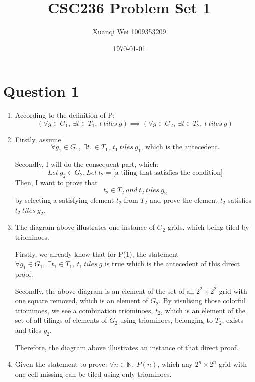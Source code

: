 \documentclass[12pt]{article}
\title{CSC236 Problem Set 1}
\author{Xuanqi Wei 1009353209}
\date{\today}
\begin{document}




\setcounter{page}{1}

\section{Question 1}
\begin{enumerate}[label=(\alph*)]
    \item According to the definition of P:
    $$(\forall g \in G_1,\ \exists t \in T_1,\ t\ tiles\ g) \implies (\forall g \in G_2,\ \exists t \in T_2,\ t\ tiles\ g) $$

    \item 
    Firstly, assume $$\forall g_1 \in G_1,\ \exists t_1 \in T_1,\ t_1\ tiles\ g_1\text{, which is the antecedent.}$$
    
    Secondly, I will do the consequent part, which: $$Let\ g_2 \in G_2.\ Let\ t_2 = \text{[a tiling that satisfies the condition]}$$ 
    Then, I want to prove that $$t_2 \in T_2\ and\ t_2\ tiles\ g_2$$ \quad \quad \quad \quad \quad \quad \quad by selecting a satisfying element $t_2$ from $T_2$ 
    and prove the element $t_2$ satisfies $t_2\ tiles\ g_2$.

    \item The diagram above illustrates one instance of $G_2$ grids, which being tiled by triominoes.
    
    Firstly, we already know that for P(1), the statement $\forall g_1 \in G_1,\ \exists t_1 \in T_1,\ t_1\ tiles\ g$ is true which is the antecedent of this direct proof.

    Secondly, the above diagram is an element of the set of all $2^2 \times 2^2$ grid with one square removed, which is an element of $G_2$. 
    By visulising those colorful triominoes, we see a combination triominoes, $t_2$, which is an element of the set of all tilings of elements of $G_2$ using triominoes, belonging to $T_2$, exists and tiles $g_2$.

    Therefore, the diagram above illustrates an instance of that direct proof.

    \item Given the statement to prove: $\forall n \in \mathbb{N},\ P(n)$, which any $2^n \times 2^n$ grid with one cell missing can be tiled using only triominoes.
    

\end{enumerate}
\end{document}
